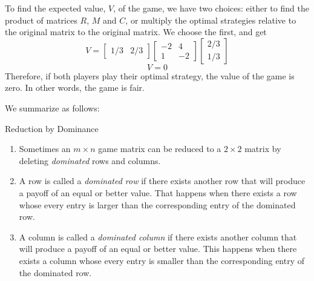 \begin{solution}
    To find the expected value, \( V \), of the game, we have two choices: either to find the product of matrices \( R \), \( M \) and \( C \), or multiply the optimal strategies relative to the original matrix to the original matrix. We choose the first, and get
    \[
        V = \begin{bmatrix} 1/3 & 2/3 \end{bmatrix}
        \begin{bmatrix}
            -2 & 4  \\
            1  & -2
        \end{bmatrix}
        \begin{bmatrix} 2/3 \\ 1/3 \end{bmatrix}
    \]
    \[ V = 0 \]
    Therefore, if both players play their optimal strategy, the value of the game is zero. In other words, the game is fair.

\end{solution}

We summarize as follows:

\begin{summarybox}{Reduction by Dominance}
    \begin{enumerate}
        \item Sometimes an \( m \times n \) game matrix can be reduced to a \( 2 \times 2 \) matrix by deleting \textit{dominated} rows and columns.
        \item A row is called a \textit{dominated row} if there exists another row that will produce a payoff of an equal or better value. That happens when there exists a row whose every entry is larger than the corresponding entry of the dominated row.
        \item A column is called a \textit{dominated column} if there exists another column that will produce a payoff of an equal or better value. This happens when there exists a column whose every entry is smaller than the corresponding entry of the dominated row.
    \end{enumerate}
\end{summarybox}